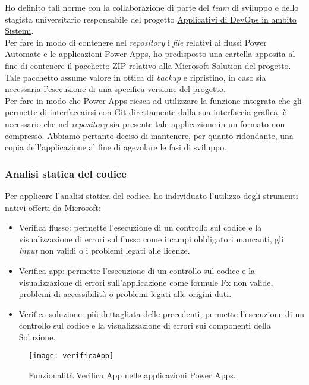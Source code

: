 \noindent Ho definito tali norme con la collaborazione di parte del \emph{team} di sviluppo e dello stagista universitario responsabile del progetto \hyperref[stageDavide]{Applicativi di DevOps in ambito Sistemi}.\\ 
Per fare in modo di contenere nel \emph{repository} i \emph{file} relativi ai flussi Power Automate e le applicazioni Power Apps, ho predisposto una cartella apposita al fine di contenere il pacchetto ZIP relativo alla Microsoft Solution del progetto.\\ 
Tale pacchetto assume valore in ottica di \emph{backup} e ripristino, in caso sia necessaria l'esecuzione di una specifica versione del progetto.\\  
Per fare in modo che Power Apps riesca ad utilizzare la funzione integrata che gli permette di interfaccairsi con Git direttamente dalla sua interfaccia grafica, è necessario che nel \emph{repository} sia presente tale applicazione in un formato non compresso.
Abbiamo pertanto deciso di mantenere, per quanto ridondante, una copia dell'applicazione al fine di agevolare le fasi di sviluppo.\\ 

\subsubsection*{Analisi statica del codice}
Per applicare l'analisi statica del codice, ho individuato l'utilizzo degli strumenti nativi offerti da Microsoft:
\begin{itemize}
    \item Verifica flusso: permette l'esecuzione di un controllo sul codice e la visualizzazione di errori sul flusso come i campi obbligatori mancanti, gli \emph{input} non validi o i problemi legati alle licenze. 
    \item Verifica app: permette l'esecuzione di un controllo sul codice e la visualizzazione di errori sull'applicazione come formule Fx non valide, problemi di accessibilità o problemi legati alle origini dati. 
    \item Verifica soluzione: più dettagliata delle precedenti, permette l'esecuzione di un controllo sul codice e la visualizzazione di errori sui componenti della Soluzione.
\end{itemize}
\begin{figure}[htbp] 
    \centering 
    \texttt{[image: verificaApp]} 
    \caption{Funzionalità Verifica App nelle applicazioni Power Apps.}
    \label{fig:verificaApp}
\end{figure}

